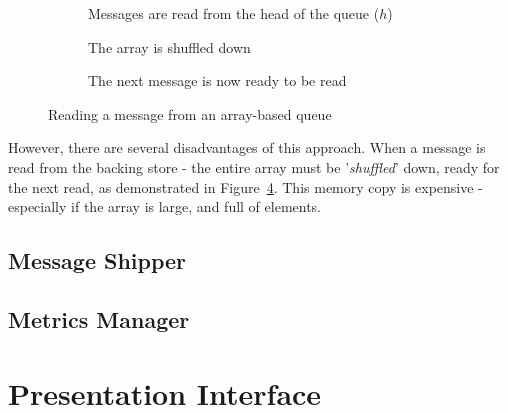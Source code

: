 \begin{figure}[ht]
  \centering
  \begin{subfigure}[b]{\textwidth}
    \centering
    
    \caption{Messages are read from the head of the queue ($h$)}
    \label{fig:tikz:queueArrayInitial}
  \end{subfigure}

  \begin{subfigure}[b]{\textwidth}
    \centering
    
    \caption{The array is shuffled down}
    \label{fig:tikz:queueArrayHeadRead}
  \end{subfigure}

  \begin{subfigure}[b]{\textwidth}
    \centering
    
    \caption{The next message is now ready to be read}
    \label{fig:tikz:queueArrayPostShuffle}
  \end{subfigure}
  \caption{Reading a message from an array-based queue}
  \label{fig:tikz:queueArray}
\end{figure}

However, there are several disadvantages of this approach. When a message is
read from the backing store - the entire array must be '\textit{shuffled}' down,
ready for the next read, as demonstrated in Figure~\ref{fig:tikz:queueArray}.
This memory copy is expensive - especially if the array is large, and full of
elements.


\subsection{Message Shipper}
\label{sub:Message Shipper}


\subsection{Metrics Manager}
\label{sub:Metrics Manager}


\section{Presentation Interface}
\label{sec:Presentation Interface}

